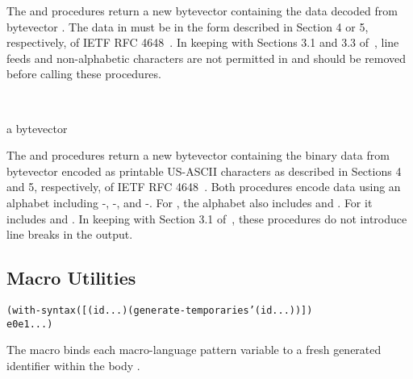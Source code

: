 The  and 
procedures return a new bytevector containing the data decoded from bytevector
.
The data in  must be in the form described in Section 4 or 5,
respectively, of IETF RFC 4648~\cite{rfc4648}.
In keeping with Sections 3.1 and 3.3 of~\cite{rfc4648},
line feeds and non-alphabetic characters are not permitted
in  and should be removed before calling these procedures.

\begin{procedure}
  \strut\\
  \strut
\end{procedure}
\returns{} a bytevector

The  and 
procedures return a new byte\-vector containing the binary data from bytevector
 encoded as printable US-ASCII characters as described in Sections 4
and 5, respectively, of IETF RFC 4648~\cite{rfc4648}.
Both procedures encode data using an alphabet including -,
-, and -.
For , the alphabet also includes \code{+} and \code{/}.
For  it includes \code{-} and \code{\_}.
In keeping with Section 3.1 of~\cite{rfc4648}, these procedures
do not introduce line breaks in the output.

\subsection{Macro Utilities}

\begin{syntax}
\end{syntax}
\expandsto{}\begin{alltt}\antipar
(with-syntax ([(id ...) (generate-temporaries '(id ...))])
  e0 e1 ...)\end{alltt}

The  macro binds each macro-language
pattern variable  to a fresh generated identifier
within the body .
